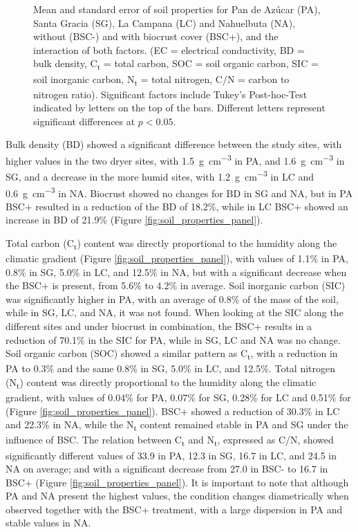 \begin{figure}[htbp]
    \caption{Mean and standard error of soil properties for Pan de Azúcar (PA), Santa Gracia (SG), La Campana (LC) and Nahuelbuta (NA), without (BSC-) and with biocrust cover (BSC+), and the interaction of both factors. (EC = electrical conductivity, BD = bulk density, C\textsubscript{t} = total carbon, SOC = soil organic carbon, SIC = soil inorganic carbon, N\textsubscript{t} = total nitrogen, C/N = carbon to nitrogen ratio). Significant factors include Tukey's Post-hoc-Test indicated by letters on the top of the bars. Different letters represent significant differences at $p <0.05$.}
    \label{fig:M1-F2-soil_properties_panel} %

\end{figure}

Bulk density (BD) showed a significant difference between the study sites, with higher values in the two dryer sites, with \SI{1.5}{\gram\per\cubic\centi\meter} in PA, and \SI{1.6}{\gram\per\cubic\centi\meter} in SG, and a decrease in the more humid sites, with \SI{1.2}{\gram\per\cubic\centi\meter} in LC and \SI{0.6}{\gram\per\cubic\centi\meter} in NA. Biocrust showed no changes for BD in SG and NA, but in PA BSC+ resulted in a reduction of the BD of 18.2\%, while in LC BSC+ showed an increase in BD of 21.9\% (Figure \ref{fig:soil_properties_panel}).

Total carbon (C\textsubscript{t}) content was directly proportional to the humidity along the climatic gradient (Figure \ref{fig:soil_properties_panel}), with values of 1.1\% in PA, 0.8\% in SG, 5.0\% in LC, and 12.5\% in NA, but with a significant decrease when the BSC+ is present, from 5.6\% to 4.2\% in average. Soil inorganic carbon (SIC) was significantly higher in PA, with an average of 0.8\% of the mass of the soil, while in SG, LC, and NA, it was not found. When looking at the SIC along the different sites and under biocrust in combination, the BSC+ results in a reduction of 70.1\% in the SIC for PA, while in SG, LC and NA was no change. Soil organic carbon (SOC) showed a similar pattern as C\textsubscript{t}, with a reduction in PA to 0.3\% and the same 0.8\% in SG, 5.0\% in LC, and 12.5\%. Total nitrogen (N\textsubscript{t}) content was directly proportional to the humidity along the climatic gradient, with values of 0.04\% for PA, 0.07\% for SG, 0.28\% for LC and 0.51\% for (Figure \ref{fig:soil_properties_panel}). BSC+ showed a reduction of 30.3\% in LC and 22.3\% in NA, while the N\textsubscript{t} content remained stable in PA and SG under the influence of BSC. The relation between C\textsubscript{t} and N\textsubscript{t}, expressed as C/N, showed significantly different values of 33.9 in PA, 12.3 in SG, 16.7 in LC, and 24.5 in NA on average; and with a significant decrease from 27.0 in BSC- to 16.7 in BSC+ (Figure \ref{fig:soil_properties_panel}). It is important to note that although PA and NA present the highest values, the condition changes diametrically when observed together with the BSC+ treatment, with a large dispersion in PA and stable values in NA.

